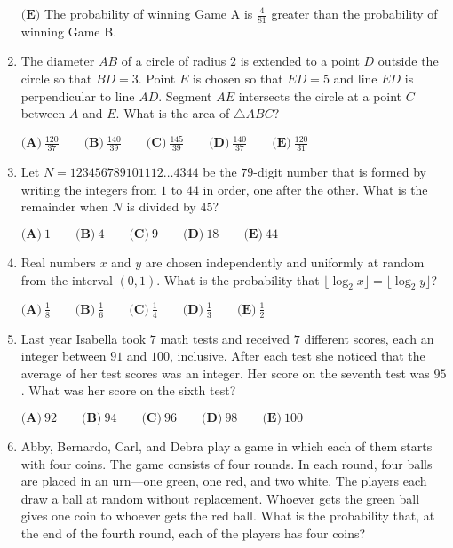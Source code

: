 \documentclass{article}
\begin{document}
\begin{enumerate}[label=\arabic*., itemsep=0.5em]
\(\textbf{(E)}\) The probability of winning Game A is \(\frac{4}{81}\) greater than the probability of winning Game B.\par \vspace{0.5em}\item The diameter \(AB\) of a circle of radius \(2\) is extended to a point \(D\) outside the circle so that \(BD=3\). Point \(E\) is chosen so that \(ED=5\) and line \(ED\) is perpendicular to line \(AD\). Segment \(AE\) intersects the circle at a point \(C\) between \(A\) and \(E\). What is the area of \(\triangle 
ABC\)?

\(\textbf{(A)}\ \frac{120}{37}\qquad\textbf{(B)}\ \frac{140}{39}\qquad\textbf{(C)}\ \frac{145}{39}\qquad\textbf{(D)}\ \frac{140}{37}\qquad\textbf{(E)}\ \frac{120}{31}\)\par \vspace{0.5em}\item Let \(N=123456789101112\dots4344\) be the \(79\)-digit number that is formed by writing the integers from \(1\) to \(44\) in order, one after the other. What is the remainder when \(N\) is divided by \(45\)?

\(\textbf{(A)}\ 1\qquad\textbf{(B)}\ 4\qquad\textbf{(C)}\ 9\qquad\textbf{(D)}\ 18\qquad\textbf{(E)}\ 44\)\par \vspace{0.5em}\item Real numbers \(x\) and \(y\) are chosen independently and uniformly at random from the interval \((0,1)\). What is the probability that \(\lfloor\log_2x\rfloor=\lfloor\log_2y\rfloor\)?

\(\textbf{(A)}\ \frac{1}{8}\qquad\textbf{(B)}\ \frac{1}{6}\qquad\textbf{(C)}\ \frac{1}{4}\qquad\textbf{(D)}\ \frac{1}{3}\qquad\textbf{(E)}\ \frac{1}{2}\)\par \vspace{0.5em}\item Last year Isabella took \(7\) math tests and received \(7\) different scores, each an integer between \(91\) and \(100\), inclusive. After each test she noticed that the average of her test scores was an integer. Her score on the seventh test was \(95\). What was her score on the sixth test?

\(\textbf{(A)}\ 92\qquad\textbf{(B)}\ 94\qquad\textbf{(C)}\ 96\qquad\textbf{(D)}\ 98\qquad\textbf{(E)}\ 100\)\par \vspace{0.5em}\item Abby, Bernardo, Carl, and Debra play a game in which each of them starts with four coins. The game consists of four rounds. In each round, four balls are placed in an urn---one green, one red, and two white. The players each draw a ball at random without replacement. Whoever gets the green ball gives one coin to whoever gets the red ball. What is the probability that, at the end of the fourth round, each of the players has four coins?


\end{enumerate}
\end{document}
